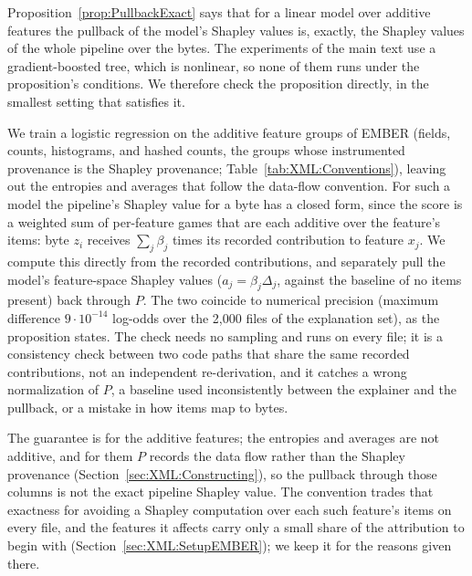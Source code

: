 \label{sec:XML:AppExactPullback}

Proposition~\ref{prop:PullbackExact} says that for a linear model over additive features the pullback of the model's
Shapley values is, exactly, the Shapley values of the whole pipeline over the bytes. The experiments of the main text
use a gradient-boosted tree, which is nonlinear, so none of them runs under the proposition's conditions. We therefore
check the proposition directly, in the smallest setting that satisfies it.

We train a logistic regression on the additive feature groups of EMBER (fields, counts, histograms, and hashed counts,
the groups whose instrumented provenance is the Shapley provenance; Table~\ref{tab:XML:Conventions}), leaving out the
entropies and averages that follow the data-flow convention. For such a model the pipeline's Shapley value for a byte
has a closed form, since the score is a weighted sum of per-feature games that are each additive over the feature's
items: byte $z_i$ receives $\sum_j \beta_j$ times its recorded contribution to feature $x_j$. We compute this directly
from the recorded contributions, and separately pull the model's feature-space Shapley values ($a_j = \beta_j \Delta_j$,
against the baseline of no items present) back through $P$. The two coincide to numerical precision
(maximum difference $9 \cdot 10^{-14}$ log-odds over the 2{,}000 files of the explanation set), as the proposition states. The
check needs no sampling and runs on every file; it is a consistency check between two code paths that share the same
recorded contributions, not an independent re-derivation, and it catches a wrong normalization of $P$, a baseline used
inconsistently between the explainer and the pullback, or a mistake in how items map to bytes.

The guarantee is for the additive features; the entropies and averages are not additive, and for them $P$ records the
data flow rather than the Shapley provenance (Section~\ref{sec:XML:Constructing}), so the pullback through those
columns is not the exact pipeline Shapley value. The convention trades that exactness for avoiding a Shapley
computation over each such feature's items on every file, and the features it affects carry only a small share of the
attribution to begin with (Section~\ref{sec:XML:SetupEMBER}); we keep it for the reasons given there.
